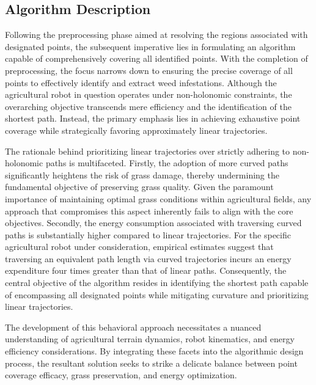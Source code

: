 
\subsection{Algorithm Description}

Following the preprocessing phase aimed at resolving the regions associated with designated points, the subsequent imperative lies in formulating an algorithm capable of comprehensively covering all identified points. With the completion of preprocessing, the focus narrows down to ensuring the precise coverage of all points to effectively identify and extract weed infestations. Although the agricultural robot in question operates under non-holonomic constraints, the overarching objective transcends mere efficiency and the identification of the shortest path. Instead, the primary emphasis lies in achieving exhaustive point coverage while strategically favoring approximately linear trajectories.

\vspace*{6mm}   

The rationale behind prioritizing linear trajectories over strictly adhering to non-holonomic paths is multifaceted. Firstly, the adoption of more curved paths significantly heightens the risk of grass damage, thereby undermining the fundamental objective of preserving grass quality. Given the paramount importance of maintaining optimal grass conditions within agricultural fields, any approach that compromises this aspect inherently fails to align with the core objectives. Secondly, the energy consumption associated with traversing curved paths is substantially higher compared to linear trajectories. For the specific agricultural robot under consideration, empirical estimates suggest that traversing an equivalent path length via curved trajectories incurs an energy expenditure four times greater than that of linear paths. Consequently, the central objective of the algorithm resides in identifying the shortest path capable of encompassing all designated points while mitigating curvature and prioritizing linear trajectories.

\vspace*{6mm}  

The development of this behavioral approach necessitates a nuanced understanding of agricultural terrain dynamics, robot kinematics, and energy efficiency considerations. By integrating these facets into the algorithmic design process, the resultant solution seeks to strike a delicate balance between point coverage efficacy, grass preservation, and energy optimization.

